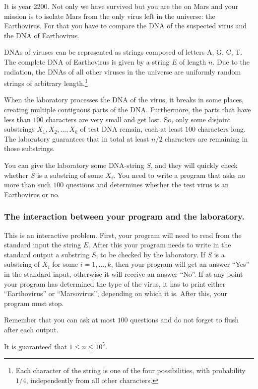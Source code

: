 It is year 2200.
Not only we have survived but you are the on Mars and your mission is to isolate Mars from the only virus left in the universe: the Earthovirus.
For that you have to compare the DNA of the suspected virus and the DNA of Earthovirus.

DNAs of viruses can be represented as strings composed of letters A, G, C, T.
The complete DNA of Earthovirus is given by a string $E$ of length $n$.
Due to the radiation, the DNAs of all other viruses in the universe are uniformly random strings of arbitrary length.\footnote{Each character of the string is one of the four possibilities, with probability $1/4$, independently from all other characters.}

When the laboratory processes the DNA of the virus, it breaks in some places, creating multiple contiguous parts of the DNA.
Furthermore, the parts that have less than $100$ characters are very small and get lost.
So, only some disjoint substrings $X_1, X_2, \dots, X_k$ of test DNA remain, each at least $100$ characters long.
The laboratory guarantees that in total at least $n / 2$ characters are remaining in those substrings.

You can give the laboratory some DNA-string $S$, and they will quickly check whether $S$ is a substring of some $X_i$.
You need to write a program that asks no more than such $100$ questions and determines whether the test virus is an Earthovirus or no.

\subsubsection*{The interaction between your program and the laboratory.}
This is an interactive problem.
First, your program will need to read from the standard input the string $E$.
After this your program needs to write in the standard output a substring $S$, to be checked by the laboratory.
If $S$ is a substring of $X_i$ for some $i = 1, \dots, k$, then your program will get an answer ``Yes'' in the standard input, otherwise it will receive an answer ``No''.
If at any point your program has determined the type of the virus, it has to print either ``Earthovirus'' or ``Marsovirus'', depending on which it is.
After this, your program must stop.

Remember that you can ask at most $100$ questions and do not forget to flush after each output.

It is guaranteed that $1 \leq n \leq 10^5$.

{
\renewcommand{\sampleinputname}{Laboratory's feedback}
\renewcommand{\sampleoutputname}{Your questions}
}
